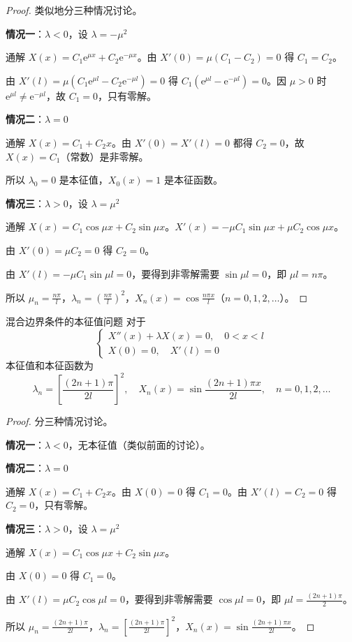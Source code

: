 \begin{proof}
类似地分三种情况讨论。

\textbf{情况一}：$\lambda < 0$，设 $\lambda = -\mu^2$

通解 $X(x) = C_1\mathrm{e}^{\mu x} + C_2\mathrm{e}^{-\mu x}$。由 $X'(0) = \mu(C_1 - C_2) = 0$ 得 $C_1 = C_2$。

由 $X'(l) = \mu(C_1\mathrm{e}^{\mu l} - C_2\mathrm{e}^{-\mu l}) = 0$ 得 $C_1(\mathrm{e}^{\mu l} - \mathrm{e}^{-\mu l}) = 0$。因 $\mu > 0$ 时 $\mathrm{e}^{\mu l} \neq \mathrm{e}^{-\mu l}$，故 $C_1 = 0$，只有零解。

\textbf{情况二}：$\lambda = 0$

通解 $X(x) = C_1 + C_2x$。由 $X'(0) = X'(l) = 0$ 都得 $C_2 = 0$，故 $X(x) = C_1$（常数）是非零解。

所以 $\lambda_0 = 0$ 是本征值，$X_0(x) = 1$ 是本征函数。

\textbf{情况三}：$\lambda > 0$，设 $\lambda = \mu^2$

通解 $X(x) = C_1\cos\mu x + C_2\sin\mu x$。$X'(x) = -\mu C_1\sin\mu x + \mu C_2\cos\mu x$。

由 $X'(0) = \mu C_2 = 0$ 得 $C_2 = 0$。

由 $X'(l) = -\mu C_1\sin\mu l = 0$，要得到非零解需要 $\sin\mu l = 0$，即 $\mu l = n\pi$。

所以 $\mu_n = \frac{n\pi}{l}$，$\lambda_n = \left(\frac{n\pi}{l}\right)^2$，$X_n(x) = \cos\frac{n\pi x}{l}$（$n = 0, 1, 2, \ldots$）。
\end{proof}
\begin{dingli}{混合边界条件的本征值问题}{}
对于
\begin{equation}
    \begin{cases}
        X''(x) + \lambda X(x) = 0, \quad 0 < x < l \\
        X(0) = 0, \quad X'(l) = 0
    \end{cases}
\end{equation}
本征值和本征函数为
\begin{equation}
    \boxed{\lambda_n = \left[\frac{(2n+1)\pi}{2l}\right]^2, \quad X_n(x) = \sin\frac{(2n+1)\pi x}{2l}, \quad n = 0, 1, 2, \ldots}
\end{equation}
\end{dingli}

\begin{proof}
分三种情况讨论。

\textbf{情况一}：$\lambda < 0$，无本征值（类似前面的讨论）。

\textbf{情况二}：$\lambda = 0$

通解 $X(x) = C_1 + C_2x$。由 $X(0) = 0$ 得 $C_1 = 0$。由 $X'(l) = C_2 = 0$ 得 $C_2 = 0$，只有零解。

\textbf{情况三}：$\lambda > 0$，设 $\lambda = \mu^2$

通解 $X(x) = C_1\cos\mu x + C_2\sin\mu x$。

由 $X(0) = 0$ 得 $C_1 = 0$。

由 $X'(l) = \mu C_2\cos\mu l = 0$，要得到非零解需要 $\cos\mu l = 0$，即 $\mu l = \frac{(2n+1)\pi}{2}$。

所以 $\mu_n = \frac{(2n+1)\pi}{2l}$，$\lambda_n = \left[\frac{(2n+1)\pi}{2l}\right]^2$，$X_n(x) = \sin\frac{(2n+1)\pi x}{2l}$。
\end{proof}
